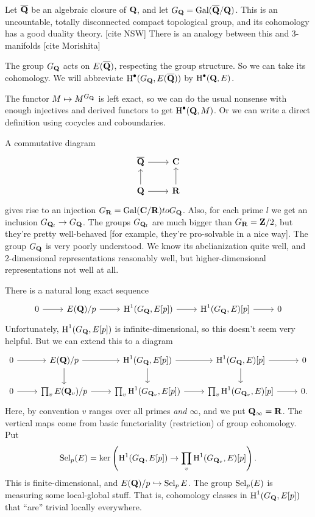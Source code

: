 Let $\overline{\mathbf{Q}}$ be an algebraic closure of $\mathbf{Q}$, and let 
$G_{\mathbf{Q}}=\operatorname{Gal}(\overline{\mathbf{Q}}/\mathbf{Q})$. This is an uncountable, totally disconnected 
compact topological group, and its cohomology has a good duality theory. [cite 
NSW] There is an analogy between this and 3-manifolds [cite Morishita]

The group $G_{\mathbf{Q}}$ acts on $E(\overline{\mathbf{Q}})$, respecting the group structure. So 
we can take its cohomology. We will abbreviate $\operatorname{H}^\bullet(G_{\mathbf{Q}},E(\overline{\mathbf{Q}}))$ 
by $\operatorname{H}^\bullet(\mathbf{Q},E)$. 

The functor $M\mapsto M^{G_{\mathbf{Q}}}$ is left exact, so we can do the usual nonsense with 
enough injectives and derived functors to get $\operatorname{H}^\bullet(\mathbf{Q},M)$. Or we can write 
a direct definition using cocycles and coboundaries. 

A commutative diagram 
\[\begin{tikzcd}
  \overline\dQ \ar[r] 
    & \dC \\
  \dQ \ar[r] \ar[u] 
    & \dR \ar[u] 
\end{tikzcd}\]
gives rise to an injection $G_{\mathbf{R}}=\operatorname{Gal}(\mathbf{C}/\mathbf{R})to G_{\mathbf{Q}}$. Also, for 
each prime $l$ we get an inclusion $G_{\mathbf{Q}_l}\to G_{\mathbf{Q}}$. The groups 
$G_{\mathbf{Q}_l}$ are much bigger than $G_{\mathbf{R}}=\mathbf{Z}/2$, but they're pretty well-behaved 
[for example, they're pro-solvable in a nice way]. The group 
$G_{\mathbf{Q}}$ is very poorly understood. We know its abelianization quite well, and 
2-dimensional representations reasonably well, but higher-dimensional 
representations not well at all. 

There is a natural long exact sequence 
\[\begin{tikzcd}
  0 \ar[r] 
    & E(\dQ)/p \ar[r] 
    & \h^1(G_\dQ,E[p]) \ar[r] 
    & \h^1(G_\dQ,E)[p] \ar[r] 
    & 0
\end{tikzcd}\]
Unfortunately, $\operatorname{H}^1(G_{\mathbf{Q}},E[p])$ is infinite-dimensional, so this doesn't seem 
very helpful. But we can extend this to a diagram 
\[\begin{tikzcd}
  0 \ar[r] 
    & E(\dQ)/p \ar[r] \ar[d] 
    & \h^1(G_\dQ,E[p]) \ar[r] \ar[d] 
    & \h^1(G_\dQ,E)[p] \ar[r] \ar[d] 
    & 0 \\
  0 \ar[r] 
    & \prod_v E(\dQ_v)/p \ar[r] 
    & \prod_v \h^1(G_{\dQ_v},E[p]) \ar[r] 
    & \prod_v \h^1(G_{\dQ_v},E)[p] \ar[r] 
    & 0 .
\end{tikzcd}\]
Here, by convention $v$ ranges over all primes \emph{and $\infty$}, and we 
put $\mathbf{Q}_\infty=\mathbf{R}$. The vertical maps come from basic functoriality 
(restriction) of group cohomology. Put 
\[
  \operatorname{Sel}_p(E) = \ker\left(\operatorname{H}^1(G_{\mathbf{Q}},E[p]) \to \prod_v \operatorname{H}^1(G_{\mathbf{Q}_v},E)[p]\right) .
\]
This is finite-dimensional, and $E(\mathbf{Q})/p\hookrightarrow \operatorname{Sel}_p E$. The group 
$\operatorname{Sel}_p(E)$ is measuring some local-global stuff. That is, cohomology 
classes in $\operatorname{H}^1(G_{\mathbf{Q}},E[p])$ that ``are'' trivial locally everywhere. 

